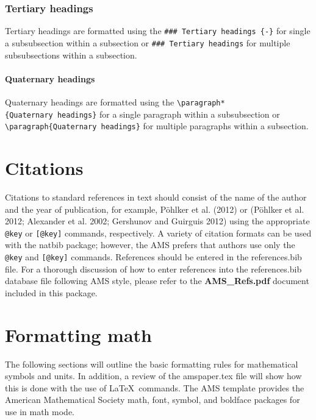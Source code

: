 \documentclass[draft]{ametsoc}
\begin{document}
\hypertarget{tertiary-headings}{%
\subsubsection*{Tertiary headings}\label{tertiary-headings}}

Tertiary headings are formatted using the
\texttt{\#\#\#\ Tertiary\ headings\ \{-\}} for single a subsubsection
within a subsection or \texttt{\#\#\#\ Tertiary\ headings} for multiple
subsubsections within a subsection.

\paragraph*{Quaternary headings}

Quaternary headings are formatted using the
\texttt{\textbackslash{}paragraph*\{Quaternary\ headings\}} for a single
paragraph within a subsubsection or
\texttt{\textbackslash{}paragraph\{Quaternary\ headings\}} for multiple
paragraphs within a subsection.

\hypertarget{citations}{%
\section{Citations}\label{citations}}

Citations to standard references in text should consist of the name of
the author and the year of publication, for example, Pöhlker et al.
(2012) or (Pöhlker et al. 2012; Alexander et al. 2002; Gershunov and
Guirguis 2012) using the appropriate \texttt{@key} or
\texttt{{[}@key{]}} commands, respectively. A variety of citation
formats can be used with the natbib package; however, the AMS prefers
that authors use only the \texttt{@key} and \texttt{{[}@key{]}}
commands. References should be entered in the references.bib file. For a
thorough discussion of how to enter references into the references.bib
database file following AMS style, please refer to the
\textbf{AMS\_Refs.pdf} document included in this package.

\hypertarget{formatting-math}{%
\section{Formatting math}\label{formatting-math}}

The following sections will outline the basic formatting rules for
mathematical symbols and units. In addition, a review of the
amspaper.tex file will show how this is done with the use of
\LaTeX~commands. The AMS template provides the American Mathematical
Society math, font, symbol, and boldface packages for use in math mode.
\end{document}
